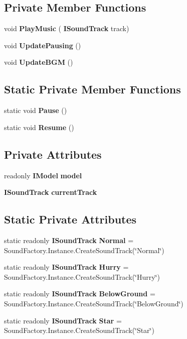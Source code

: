 \subsection*{Private Member Functions}
\begin{DoxyCompactItemize}
\item 
void \textbf{ Play\+Music} (\textbf{ I\+Sound\+Track} track)
\item 
void \textbf{ Update\+Pausing} ()
\item 
void \textbf{ Update\+B\+GM} ()
\end{DoxyCompactItemize}
\subsection*{Static Private Member Functions}
\begin{DoxyCompactItemize}
\item 
static void \textbf{ Pause} ()
\item 
static void \textbf{ Resume} ()
\end{DoxyCompactItemize}
\subsection*{Private Attributes}
\begin{DoxyCompactItemize}
\item 
readonly \textbf{ I\+Model} \textbf{ model}
\item 
\textbf{ I\+Sound\+Track} \textbf{ current\+Track}
\end{DoxyCompactItemize}
\subsection*{Static Private Attributes}
\begin{DoxyCompactItemize}
\item 
static readonly \textbf{ I\+Sound\+Track} \textbf{ Normal} = Sound\+Factory.\+Instance.\+Create\+Sound\+Track(\char`\"{}Normal\char`\"{})
\item 
static readonly \textbf{ I\+Sound\+Track} \textbf{ Hurry} = Sound\+Factory.\+Instance.\+Create\+Sound\+Track(\char`\"{}Hurry\char`\"{})
\item 
static readonly \textbf{ I\+Sound\+Track} \textbf{ Below\+Ground} = Sound\+Factory.\+Instance.\+Create\+Sound\+Track(\char`\"{}Below\+Ground\char`\"{})
\item 
static readonly \textbf{ I\+Sound\+Track} \textbf{ Star} = Sound\+Factory.\+Instance.\+Create\+Sound\+Track(\char`\"{}Star\char`\"{})
\end{DoxyCompactItemize}


